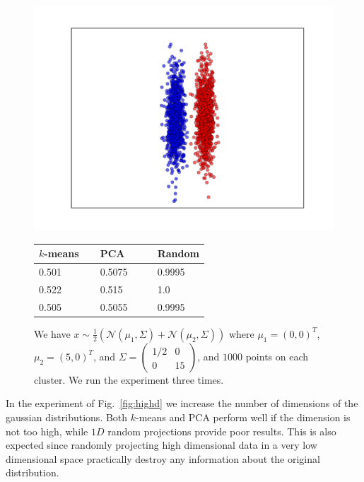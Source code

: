 \documentclass[aps,preprint,nofootinbib,floatfix]{revtex4-1}
\begin{document}
\begin{figure}
\begin{minipage}{.49\textwidth}
\includegraphics[scale=.45]{2d_cigar.pdf}
\end{minipage}
\begin{minipage}{.49\textwidth}
\begin{tabular}{  l  l  l }
\hline
$k$-means~~ & PCA~~~~ & Random \\
\hline
0.501 & 0.5075 & 0.9995 \\
0.522 & 0.515 & 1.0 \\
0.505 & 0.5055 & 0.9995 \\
\hline
\end{tabular}
\end{minipage}
\caption{\label{fig:cigar}
We have $x \sim \tfrac{1}{2}\left( \mathcal{N}(\mu_1, \Sigma) +
\mathcal{N}(\mu_2, \Sigma)\right)$ where $\mu_1 = (0,0)^T$, $\mu_2=(5,0)^T$,
and $\Sigma = \left( \begin{smallmatrix} 1/2 & 0 \\ 0 & 15 \end{smallmatrix}
\right)$,
and $1000$ points on each cluster. We run the experiment three times.
}
\end{figure}

In the experiment of Fig.~\ref{fig:highd} we increase the number of
dimensions of the gaussian distributions. Both $k$-means and PCA perform well
if the dimension is not too high, while $1D$ random projections provide
poor results. This is also expected since randomly projecting high dimensional
data in a very low dimensional space practically destroy any information
about the original distribution.
\end{document}
